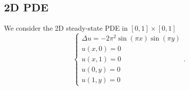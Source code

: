 \documentclass[12pt]{report} %
\newcommand{\mathLaplace}{\Delta}
\begin{document}





\clearpage
\subsection{2D PDE}

We consider the 2D steady-state PDE in $[0, 1] \times [0, 1]$
\begin{equation}
  \left\{\begin{array}{l}
    \mathLaplace u = - 2 \pi^2 \sin (\pi x) \sin (\pi y) \\
    u (x, 0) = 0                                         \\
    u (x, 1) = 0                                         \\
    u (0, y) = 0                                         \\
    u (1, y) = 0
  \end{array}\right. . \label{eqn-problem-pde-2d}
\end{equation}
\end{document}
